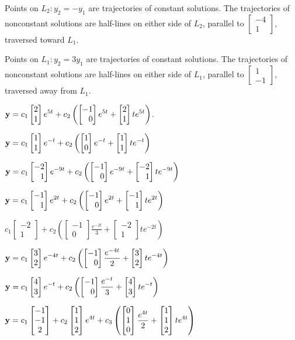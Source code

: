 Points on $L_2:y_2=-y_1$ are trajectories of constant solutions.
The trajectories of nonconstant solutions are half-lines on either
side of $L_2$, parallel to
$\begin{bmatrix}-4\\1\end{bmatrix}$, traversed toward $L_1$.

Points on $L_1:y_2=3y_1$ are trajectories of constant solutions.
The trajectories of nonconstant solutions are half-lines on either
side of $L_1$, parallel to
$\begin{bmatrix}1\\-1\end{bmatrix}$, traversed away from $L_1$.



  $\mathbf{y}=\displaystyle{c_1\begin{bmatrix}2\\1\end{bmatrix}e^{5t}
+c_2\left(\begin{bmatrix}-1\\\phantom{-}0\end{bmatrix}e^{5t}+\begin{bmatrix}2\\1\end{bmatrix}te^{5t}\right)}$.

\smallskip
{}
$\mathbf{y}=\displaystyle{
c_1\begin{bmatrix}1\\1\end{bmatrix}e^{-t}+c_2\left(\begin{bmatrix}1\\0\end{bmatrix}e^{-t}+\begin{bmatrix}1\\1\end{bmatrix}te^{-t}\right)}$

\smallskip
{}
$\mathbf{y}=\displaystyle{
c_1\begin{bmatrix}-2\\\phantom{-}1\end{bmatrix}e^{-9t}+c_2\left(\begin{bmatrix}-1\\\phantom{-}0\end{bmatrix}e^{-9t}
+\begin{bmatrix}-2\\\phantom{-}1\end{bmatrix}te^{-9t}\right)}$

\smallskip
{}
 $\mathbf{y}=\displaystyle{
c_1\begin{bmatrix}-1\\\phantom{-}1\end{bmatrix}e^{2t}+c_2\left(\begin{bmatrix}-1\\\phantom{-}0\end{bmatrix}
e^{2t}+\begin{bmatrix}-1\\\phantom{-}1\end{bmatrix}te^{2t}\right)}$

\smallskip

$c_{1}\begin{bmatrix}-2\\1\end{bmatrix}
+c_{2}\left(
\begin{bmatrix}-1\\0\end{bmatrix}\frac{e^{-2t}}{3}+
\begin{bmatrix}-2\\1\end{bmatrix}te^{-2t}\right)$

\smallskip
{}
$\mathbf{y}=\displaystyle{c_1\begin{bmatrix}3\\2\end{bmatrix}e^{-4t}+
c_2\left(\begin{bmatrix}-1\\\phantom{-}0\end{bmatrix}\frac{e^{-4t}}{2}+\begin{bmatrix}3\\2\end{bmatrix}te^{-4t}\right)}$

\smallskip
{}
 $\mathbf{y}=\displaystyle{c_1\begin{bmatrix}4\\3\end{bmatrix}e^{-t}+
c_2\left(\begin{bmatrix}-1\\\phantom{-}0\end{bmatrix}\frac{e^{-t}}{3}+\begin{bmatrix}4\\3\end{bmatrix}te^{-t}\right)}$

\smallskip
{}
$\mathbf{y}=\displaystyle{c_1\begin{bmatrix}-1\\-1\\2\end{bmatrix}+c_2\begin{bmatrix}1\\1\\2\end{bmatrix}e^{4t}+
c_3\left(\begin{bmatrix}0\\1\\0\end{bmatrix}\frac{e^{4t}}{2}+\begin{bmatrix}1\\1\\2\end{bmatrix}te^{4t}\right)}$

